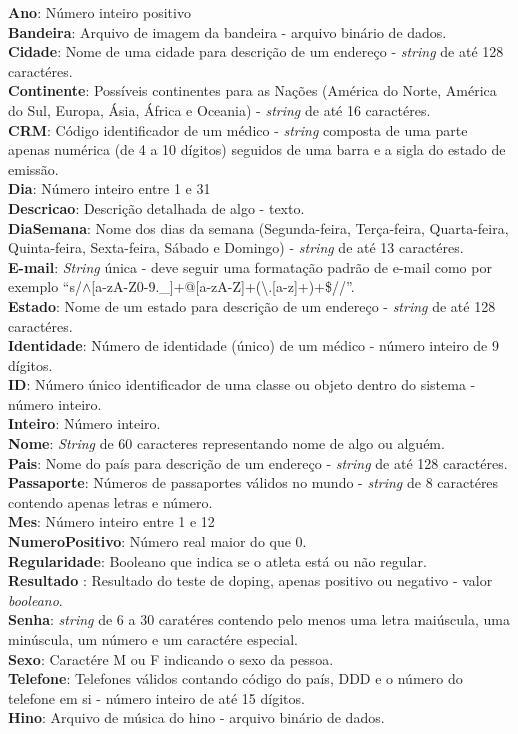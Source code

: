 \documentclass[12pt,a4paper]{article}
\begin{document}
    {\bf Ano}: Número inteiro positivo \\
    {\bf Bandeira}: Arquivo de imagem da bandeira - arquivo binário de dados. \\
    {\bf Cidade}: Nome de uma cidade para descrição de um endereço - {\it string} de até 128 caractéres. \\
    {\bf Continente}: Possíveis continentes para as Nações (América do Norte, América do Sul, Europa, Ásia, África e Oceania) - {\it string} de até 16 caractéres. \\
    {\bf CRM}: Código identificador de um médico - {\it string} composta de uma parte apenas numérica (de 4 a 10 dígitos) seguidos de uma barra e a sigla do estado de emissão. \\
    {\bf Dia}: Número inteiro entre 1 e 31 \\
    {\bf Descricao}: Descrição detalhada de algo - texto.\\
    {\bf DiaSemana}: Nome dos dias da semana (Segunda-feira, Terça-feira, Quarta-feira, Quinta-feira, Sexta-feira, Sábado e Domingo) - {\it string} de até 13 caractéres. \\
    {\bf E-mail}: {\it String} única - deve seguir uma formatação padrão de e-mail como por exemplo ``s/$\wedge$[a-zA-Z0-9.\_]+@[a-zA-Z]+(\textbackslash.[a-z]+)+\$//''. \\
    {\bf Estado}: Nome de um estado para descrição de um endereço - {\it string} de até 128 caractéres. \\
    {\bf Identidade}: Número de identidade (único) de um médico - número inteiro de 9 dígitos. \\
    {\bf ID}: Número único identificador de uma classe ou objeto dentro do sistema - número inteiro. \\
    {\bf Inteiro}: Número inteiro. \\
    {\bf Nome}: {\it String} de 60 caracteres representando nome de algo ou alguém. \\
    {\bf Pais}: Nome do país para descrição de um endereço - {\it string} de até 128 caractéres. \\
    {\bf Passaporte}: Números de passaportes válidos no mundo - {\it string} de 8 caractéres contendo apenas letras e número. \\
    {\bf Mes}: Número inteiro entre 1 e 12 \\
    {\bf NumeroPositivo}: Número real maior do que 0. \\
    {\bf Regularidade}: Booleano que indica se o atleta está ou não regular. \\
    {\bf Resultado} : Resultado do teste de doping, apenas positivo ou negativo - valor {\it booleano}. \\
    {\bf Senha}: {\it string} de 6 a 30 caratéres contendo pelo menos uma letra maiúscula, uma minúscula, um número e um caractére especial. \\
    {\bf Sexo}: Caractére M ou F indicando o sexo da pessoa. \\
    {\bf Telefone}: Telefones válidos contando código do país, DDD e o número do telefone em si - número inteiro de até 15 dígitos. \\
    {\bf Hino}: Arquivo de música do hino - arquivo binário de dados.\\
\end{document}
